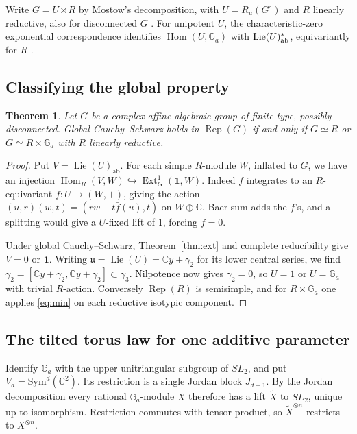 \documentclass[11pt,reqno]{amsart}
\newtheorem{theorem}{Theorem}[section]
\theoremstyle{definition}
\newcommand{\Hom}{\operatorname{Hom}}
\newcommand{\Ext}{\operatorname{Ext}}
\newcommand{\one}{\mathbf 1}
\newcommand{\CC}{\mathbb C}
\newcommand{\Ga}{\mathbb G_a}
\newcommand{\Rep}{\operatorname{Rep}}
\DeclareMathOperator{\Lie}{Lie}
\begin{document}
Write $G=U\rtimes R$ by Mostow's decomposition, with $U=R_u(G^\circ)$ and $R$ linearly reductive, also for disconnected $G$ \cite[Proposition~5.4.1 and its proof]{Conrad}. For unipotent $U$, the characteristic-zero exponential correspondence identifies $\Hom(U,\Ga)$ with $\Lie(U)_{\rm ab}^*$, equivariantly for $R$ \cite[Theorem~14.37]{Milne}.

\subsection{Classifying the global property}
\begin{theorem}\label{thm:global-groups}
Let $G$ be a complex affine algebraic group of finite type, possibly disconnected. Global Cauchy--Schwarz holds in $\Rep(G)$ if and only if $G\simeq R$ or $G\simeq R\times\Ga$ with $R$ linearly reductive.
\end{theorem}

\begin{proof}
Put $V=\Lie(U)_{\mathrm{ab}}$. For each simple $R$-module $W$, inflated to $G$, we have an injection $\Hom_R(V,W)\hookrightarrow\Ext^1_G(\one,W)$. Indeed $f$ integrates to an $R$-equivariant $\bar f:U\to(W,+)$, giving the action $(u,r)(w,t)=(rw+t\bar f(u),t)$ on $W\oplus\CC$. Baer sum adds the $f$'s, and a splitting would give a $U$-fixed lift of $1$, forcing $f=0$.

Under global Cauchy--Schwarz, Theorem~\ref{thm:ext} and complete reducibility give $V=0$ or $\one$. Writing $\mathfrak u=\Lie(U)=\CC y+\gamma_2$ for its lower central series, we find $\gamma_2=[\CC y+\gamma_2,\CC y+\gamma_2]\subset\gamma_3$. Nilpotence now gives $\gamma_2=0$, so $U=1$ or $U=\Ga$ with trivial $R$-action. Conversely $\Rep(R)$ is semisimple, and for $R\times\Ga$ one applies \eqref{eq:min} on each reductive isotypic component.
\end{proof}

\subsection{The tilted torus law for one additive parameter}
Identify $\Ga$ with the upper unitriangular subgroup of $SL_2$, and put
$V_d=\mathrm{Sym}^d(\CC^2)$. Its restriction is a single Jordan block
$J_{d+1}$. By the Jordan decomposition every rational $\Ga$-module $X$
therefore has a lift $\widetilde X$ to $SL_2$, unique up to isomorphism.
Restriction commutes with tensor product, so $\widetilde X^{\otimes n}$
restricts to $X^{\otimes n}$.
\end{document}
